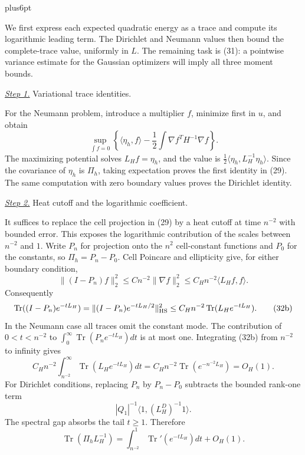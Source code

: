 \documentclass[11pt,reqno]{amsart}
\makeatletter
\theoremstyle{plain}
\theoremstyle{definition}
\theoremstyle{remark}
\renewenvironment{proof}[1][\proofname]{%
  \par
  \pushQED{\qed}%
  \normalfont
  \topsep6pt plus6pt\relax
  \trivlist
  \item[\hskip\labelsep\slshape #1\@addpunct{.}]%
  \ignorespaces
}{%
  \popQED
  \endtrivlist
  \@endpefalse
}
\DeclareRobustCommand{\qed}{%
  \leavevmode\unskip\penalty9999\hbox{}\nobreak
  \ifmmode
    \makebox[0pt][l]{\qquad\hbox{\qedsymbol}}%
  \else
    \qquad\hbox{\qedsymbol}%
  \fi
}
\renewcommand{\qedsymbol}{\rule[.47pt]{4pt}{6pt}}
\numberwithin{equation}{section}
\newcommand{\1}{\mathbf 1}
\makeatother
\begin{document}
\begin{proof}
We first express each expected quadratic energy as a trace and compute
its logarithmic leading term.  The Dirichlet and Neumann values then
bound the complete-trace value, uniformly in $L$.  The remaining task
is (31): a pointwise variance estimate for the Gaussian optimizers
will imply all three moment bounds.

\smallskip\noindent
\underline{\textit{Step 1.}} Variational trace identities.

For the Neumann problem, introduce a multiplier $f$, minimize first in
$u$, and obtain
\begin{equation*}
\sup_ {\int f=0}\left\{\langle\eta_ h,f\rangle
-\frac12\int\nabla f^TH^{-1}\nabla f\right\}.
\end{equation*}
The maximizing potential solves $L_Hf=\eta_h$, and the value is
$\frac12\langle\eta_h,L_H^{-1}\eta_h\rangle$.  Since the covariance
of $\eta_h$ is $\Pi_h$, taking expectation proves the first identity
in (29).  The same computation with zero boundary values proves the
Dirichlet identity.

\smallskip\noindent
\underline{\textit{Step 2.}} Heat cutoff and the logarithmic coefficient.

It suffices to replace the cell projection in (29) by a heat cutoff at
time $n^{-2}$ with bounded error.  This exposes the logarithmic
contribution of the scales between $n^{-2}$ and $1$.
Write $P_n$ for projection onto the $n^2$ cell-constant functions and
$P_0$ for the constants, so $\Pi_h=P_n-P_0$.  Cell Poincare and
ellipticity give, for either boundary condition,
\begin{equation}
\|(I-P_ n)f\|_ 2^2\leq Cn^{-2}\|\nabla f\|_ 2^2
\leq C_ Hn^{-2}\langle L_ Hf,f\rangle.
\tag{32a}
\end{equation}
Consequently
\begin{equation}
\operatorname {Tr}((I-P_ n)e^{-tL_ H})
=\|(I-P_ n)e^{-tL_ H/2}\|_ {\rm HS}^2
\leq C_ Hn^{-2}\operatorname {Tr}(L_ He^{-tL_ H}).
\tag{32b}
\end{equation}
In the Neumann case all traces omit the constant mode.  The contribution
of $0<t<n^{-2}$ to
$\int_ 0^\infty\operatorname {Tr}(P_ ne^{-tL_ H})dt$ is at most one.
Integrating (32b) from $n^{-2}$ to infinity gives
\begin{equation}
C_ Hn^{-2}\int_ {n^{-2}}^\infty
\operatorname {Tr}(L_ He^{-tL_ H})dt
=C_ Hn^{-2}\operatorname {Tr}(e^{-n^{-2}L_ H})=O_ H(1).
\tag{32c}
\end{equation}
For Dirichlet conditions, replacing $P_n$ by $P_n-P_0$ subtracts the
bounded rank-one term
\[
|Q_1|^{-1}\langle1,(L_H^D)^{-1}1\rangle.
\]
The spectral gap absorbs the tail $t\geq1$.  Therefore
\begin{equation}
\operatorname {Tr}(\Pi_ hL_ H^{-1})
=\int_ {n^{-2}}^1\operatorname {Tr}'(e^{-tL_ H})dt+O_ H(1).
\tag{32d}
\end{equation}


\end{proof}
\end{document}
